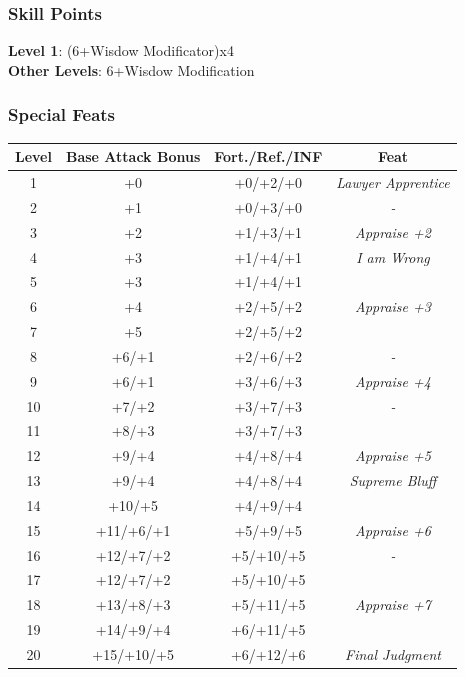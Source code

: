 \documentclass[ letterpaper,12pt]{article}
\begin{document}
\subsubsection{Skill Points}
{\bf Level 1}: (6+Wisdow Modificator)x4\\
{\bf Other Levels}: 6+Wisdow Modification\\

\subsubsection{Special Feats}

\begin{center} \begin{tabular}{|c||c|c|c|}
\hline
{\bf Level}&{\bf Base Attack Bonus}&{\bf Fort./Ref./INF}&{\bf Feat}\\
\hline
1&+0&+0/+2/+0&{\it Lawyer Apprentice}\\
\hline
2&+1&+0/+3/+0&{\it - }\\
\hline
3&+2&+1/+3/+1&{\it Appraise +2}\\
\hline
4&+3&+1/+4/+1&{\it I am Wrong}\\
\hline
5&+3&+1/+4/+1&{\it }\\
\hline
6&+4&+2/+5/+2&{\it Appraise +3}\\
\hline
7&+5&+2/+5/+2&{\it }\\
\hline
8&+6/+1&+2/+6/+2&{\it - }\\
\hline
9 & +6/+1& +3/+6/+3 & {\it Appraise +4}\\
\hline
10 & +7/+2 & +3/+7/+3 & {\it -}\\
\hline
11 & +8/+3 & +3/+7/+3 & {\it }\\
\hline
12 & +9/+4 & +4/+8/+4 & {\it Appraise +5}\\
\hline
13 & +9/+4 & +4/+8/+4 & {\it Supreme Bluff}\\
\hline
14 & +10/+5 & +4/+9/+4 & {\it }\\
\hline
15 & +11/+6/+1 & +5/+9/+5 & {\it Appraise +6}\\
\hline
16 & +12/+7/+2 & +5/+10/+5 & {\it -}\\
\hline
17 & +12/+7/+2 & +5/+10/+5 & {\it }\\
\hline
18 & +13/+8/+3 & +5/+11/+5 & {\it Appraise +7}\\
\hline
19 & +14/+9/+4 & +6/+11/+5 & {\it }\\
\hline
20 & +15/+10/+5 & +6/+12/+6 & {\it Final Judgment}\\
\hline
\end{tabular} \end{center}
\end{document}
